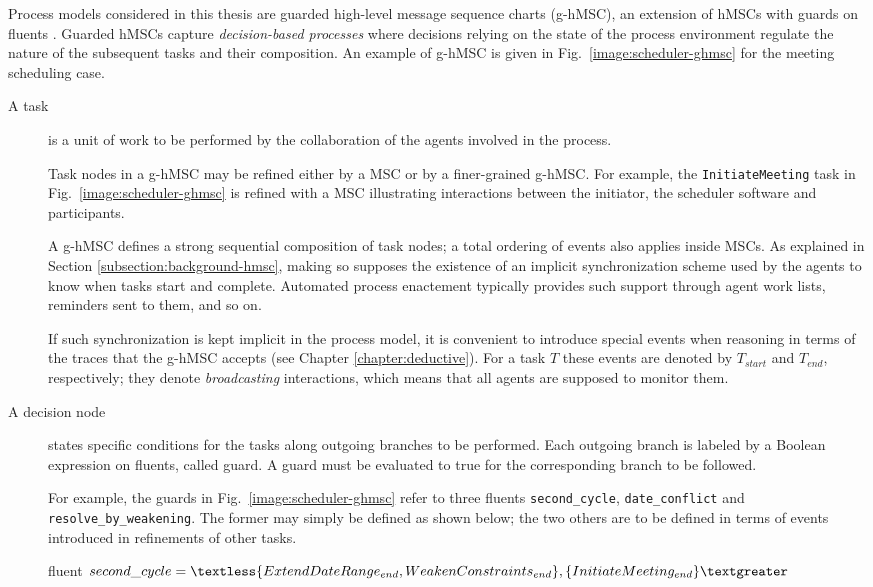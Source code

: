 Process models considered in this thesis are guarded high-level message sequence charts (g-hMSC), an extension of hMSCs with guards on fluents \cite{Damas:2009, Damas:2011}. Guarded hMSCs capture \emph{decision-based processes} where decisions relying on the state of the process environment regulate the nature of the subsequent tasks and their composition. An example of g-hMSC is given in Fig.~\ref{image:scheduler-ghmsc} for the meeting scheduling case. 
\begin{description}

\item[A task] is a unit of work to be performed by the collaboration of the agents involved in the process. 

Task nodes in a g-hMSC may be refined either by a MSC or by a finer-grained g-hMSC. For example, the \texttt{InitiateMeeting} task in Fig.~\ref{image:scheduler-ghmsc} is refined with a MSC illustrating interactions between the initiator, the scheduler software and participants. 

A g-hMSC defines a strong sequential composition of task nodes; a total ordering of events also applies inside MSCs. As explained in Section \ref{subsection:background-hmsc}, making so supposes the existence of an implicit synchronization scheme used by the agents to know when tasks start and complete. Automated process enactement typically provides such support through agent work lists, reminders sent to them, and so on. 

If such synchronization is kept implicit in the process model, it is convenient to introduce special events when reasoning in terms of the traces that the g-hMSC accepts (see Chapter \ref{chapter:deductive}). For a task $T$ these events are denoted by $T_{start}$ and $T_{end}$, respectively; they denote \emph{broadcasting} interactions, which means that all agents are supposed to monitor them. 

\item[A decision node] states specific conditions for the tasks along outgoing branches to be performed. Each outgoing branch is labeled by a Boolean expression on fluents, called guard. A guard must be evaluated to true for the corresponding branch to be followed.

For example, the guards in Fig.~\ref{image:scheduler-ghmsc} refer to three fluents \texttt{second\_cycle}, \texttt{date\_conflict} and \texttt{resolve\_by\_weakening}. The former may simply be defined as shown below; the two others are to be defined in terms of events introduced in refinements of other tasks.
\begin{center}
fluent $second\_cycle = \textless \{ ExtendDateRange_{end}, \newline WeakenConstraints_{end} \},
 \{ InitiateMeeting_{end} \} \textgreater $\\
\end{center}


\end{description}
